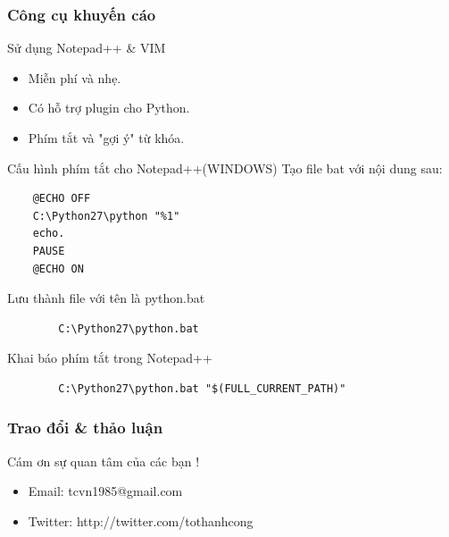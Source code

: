 \documentclass[10pt]{beamer}
\newcommand\sFontvi{\fontsize{8}{7.2}\selectfont} %
\begin{document}
\label{Slide: Cong cu khuyen cao Notepad++}
\begin{frame}[fragile]
\frametitle{Công cụ khuyến cáo}
\begin{block}{Sử dụng Notepad++ \& VIM}
\begin{itemize}
\item Miễn phí và nhẹ.
\item Có hỗ trợ plugin cho Python.
\item Phím tắt và "gợi ý" từ khóa.
\end{itemize}
\end{block}
\sFontvi
\begin{block}{Cấu hình phím tắt cho Notepad++(WINDOWS)}
Tạo file bat với nội dung sau:
\begin{verbatim}
	@ECHO OFF
	C:\Python27\python "%1"
	echo.
	PAUSE
	@ECHO ON
\end{verbatim}
Lưu thành file với tên là python.bat
\noindent 
\begin{verbatim}
 		C:\Python27\python.bat
\end{verbatim} 
Khai báo phím tắt trong Notepad++ 
\begin{verbatim}
		C:\Python27\python.bat "$(FULL_CURRENT_PATH)"
\end{verbatim}
\end{block}
\end{frame}
\label{Trao doi & Thao Luan}
\begin{frame}
\frametitle{Trao đổi \& thảo luận}
\Huge{\centerline{Cám ơn sự quan tâm của các bạn !}}
\sFontvi	
	\begin{itemize}
		\item Email: tcvn1985@gmail.com
		\item Twitter: http://twitter.com/tothanhcong
	\end{itemize}
\end{frame}
\end{document}
